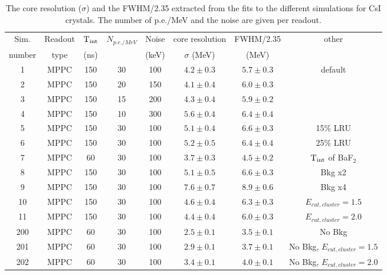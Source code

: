 \begin{table}[htb]
\begin{center}
\begin{tabular}{|c|c|c|c|c|c|c|c|}\hline
Sim.       & Readout      & $\rm T_{int}$ & $N_{p.e./ MeV}$ & Noise & core resolution  & FWHM/2.35 & other\\
number     & type         &  (ns)         &                 & (keV) & $\sigma$ (MeV)   & (MeV)     &      \\\hline
1          & MPPC         & 150           &  30             & 100    & $ 4.2 \pm 0.3 $  & $ 5.7 \pm 0.3 $ & default\\
2          & MPPC         & 150           &  20             & 150    & $ 4.1 \pm 0.4 $  & $ 6.0 \pm 0.3 $ & \\
3          & MPPC         & 150           &  15             & 200    & $ 4.3 \pm 0.4 $  & $ 5.9 \pm 0.2 $ & \\
4          & MPPC         & 150           &  10             & 300    & $ 5.6 \pm 0.4 $  & $ 6.4 \pm 0.4 $ & \\
5          & MPPC         & 150           &  30             & 100    & $ 5.1 \pm 0.4 $  & $ 6.6 \pm 0.3 $ & 15\% LRU \\
6          & MPPC         & 150           &  30             & 100    & $ 5.2 \pm 0.5 $  & $ 6.4 \pm 0.4 $ & 25\% LRU \\
7          & MPPC         &  60           &  30             & 100    & $ 3.7 \pm 0.3 $  & $ 4.5 \pm 0.2 $ & $\rm T_{int}$ of BaF$_2$ \\ 
8          & MPPC         & 150           &  30             & 100    & $ 5.1 \pm 0.5 $  & $ 6.6 \pm 0.3 $ & Bkg x2 \\
9          & MPPC         & 150           &  30             & 100    & $ 7.6 \pm 0.7 $  & $ 8.9 \pm 0.6 $ & Bkg x4 \\
10         & MPPC         & 150           &  30             & 100    & $ 4.6 \pm 0.4 $  & $ 6.3 \pm 0.3 $ & $E_{cut,cluster} = 1.5$ \\
11         & MPPC         & 150           &  30             & 100    & $ 4.4 \pm 0.4 $  & $ 6.0 \pm 0.3 $ & $E_{cut,cluster} = 2.0$ \\\hline
200        & MPPC         &  60           &  30             & 100    & $ 2.5 \pm 0.1 $  & $ 3.5 \pm 0.1 $ & No Bkg \\ 
201        & MPPC         &  60           &  30             & 100    & $ 2.9 \pm 0.1 $  & $ 3.7 \pm 0.1 $ & No Bkg, $E_{cut,cluster} = 1.5$ \\ 
202        & MPPC         &  60           &  30             & 100    & $ 3.4 \pm 0.1 $  & $ 4.0 \pm 0.1 $ & No Bkg, $E_{cut,cluster} = 2.0$ \\ \hline
\end{tabular}
\end{center}
\caption{The core resolution ($\sigma$) and the FWHM/2.35 extracted from the fits to the different simulations for CsI 
crystals. The number of p.e./MeV and the noise are given per readout.}
\label{sim:results2}
\end{table}   



